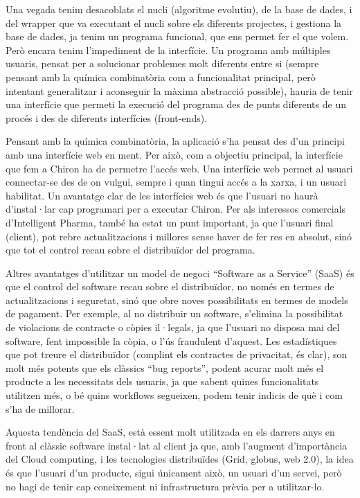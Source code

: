 Una vegada tenim desacoblats el nucli (algoritme evolutiu), de la base de dades,
i del wrapper que va executant el nucli sobre els diferents projectes, i gestiona
la base de dades, ja tenim un programa funcional, que ens permet fer el que
volem.  Però encara tenim l'impediment de la interfície.  Un programa amb
múltiples usuaris, pensat per a solucionar problemes molt diferents entre si
(sempre pensant amb la química combinatòria com a funcionalitat principal,
 però intentant generalitzar i aconseguir la màxima abstracció possible), hauria
de tenir una interfície que permeti la execució del programa des de punts
diferents de un procés i des de diferents interfícies (front-ends).

Pensant amb la química combinatòria, la aplicació s'ha pensat des
d'un principi amb una interfície web en ment.  Per això, com a objectiu
principal, la interfície que fem a Chiron ha de permetre l'accés web.  Una
interfície web permet al usuari connectar-se des de on vulgui, sempre i quan
tingui accés a la xarxa, i un usuari habilitat.  Un avantatge clar de les
interfícies web és que l'usuari no haurà d'instal·lar cap programari per a executar
Chiron.  Per als interessos comercials d'Intelligent Pharma, també ha estat un
punt important, ja que l'usuari  final (client), pot rebre actualitzacions i
millores sense haver de fer res en absolut, sinó que tot el control recau sobre
el distribuïdor del programa.

Altres avantatges d'utilitzar un model de negoci ``Software as a Service''
(SaaS) és que el control del software recau sobre el distribuïdor, no només en
termes de actualitzacions i seguretat, sinó que obre noves possibilitats en
termes de models de pagament.   Per exemple, al no distribuir un software,
s'elimina la possibilitat de violacions de contracte o còpies il·legals, ja que
l'usuari no disposa mai del software, fent impossible la còpia, o l'ús
fraudulent d'aquest.  Les estadístiques que pot treure el distribuïdor (complint
els contractes de privacitat, és clar), son molt més potents que els clàssics
``bug reports'', podent acurar molt més el producte a les necessitats dels
usuaris, ja que sabent quines funcionalitats utilitzen més, o bé quins workflows
segueixen, podem tenir indicis de què i com s'ha de millorar.

Aquesta tendència del SaaS, està essent molt utilitzada en els darrers anys en
front al clàssic software instal·lat al client ja que, amb l'augment d'importància
del Cloud computing, i les tecnologies distribuïdes (Grid, globus, web 2.0), la
idea és que l'usuari d'un producte, sigui únicament això, un usuari d'un servei,
però no hagi de tenir cap coneixement ni infrastructura prèvia per a
utilitzar-lo.

